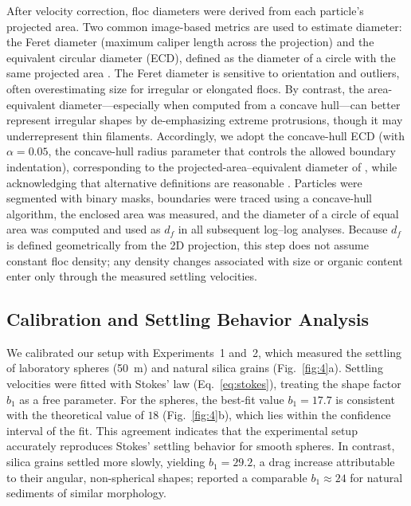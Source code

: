 \documentclass{agujournal2019}
\providecommand{\DIFadd}[1]{{\protect\color{blue}#1}}
\begin{document}
After velocity correction, floc diameters were derived from each particle’s projected area. Two common image-based metrics are used to estimate diameter: the Feret diameter (maximum caliper length across the projection) and the equivalent circular diameter (ECD), defined as the diameter of a circle with the same projected area \cite{jarvis2005measuring, smith2015image}. The Feret diameter is sensitive to orientation and outliers, often overestimating size for irregular or elongated flocs. By contrast, the area-equivalent diameter—especially when computed from a concave hull—can better represent irregular shapes by de-emphasizing extreme protrusions, though it may underrepresent thin filaments. Accordingly, we adopt the concave-hull ECD (with $\alpha = 0.05$, the concave-hull radius parameter that controls the allowed boundary indentation), corresponding to the projected-area–equivalent diameter of , while acknowledging that alternative definitions are reasonable \cite{jarvis2005measuring}. Particles were segmented with binary masks, boundaries were traced using a concave-hull algorithm, the enclosed area was measured, and the diameter of a circle of equal area was computed and used as \(d_f\) in all subsequent log–log analyses. \DIFadd{ Because $d_f$ is defined geometrically from the 2D projection, this step does not assume constant floc density; any density changes associated with size or organic content enter only through the measured settling velocities.}


\subsection{Calibration and Settling Behavior Analysis}

We calibrated our setup with Experiments~1 and~2, which measured the settling of laboratory spheres (50~\textmu m) and natural silica grains (Fig.~\ref{fig:4}a). Settling velocities were fitted with Stokes’ law (Eq.~\eqref{eq:stokes}), treating the shape factor $b_1$ as a free parameter. For the spheres, the best-fit value $b_1 = 17.7$ is consistent with the theoretical value of $18$ (Fig.~\ref{fig:4}b), which lies within the confidence interval of the fit. This agreement indicates that the experimental setup accurately reproduces Stokes’ settling behavior for smooth spheres. In contrast, silica grains settled more slowly, yielding $b_1 = 29.2$, a drag increase attributable to their angular, non-spherical shapes;  reported a comparable $b_1 \approx 24$ for natural sediments of similar morphology.
\end{document}
